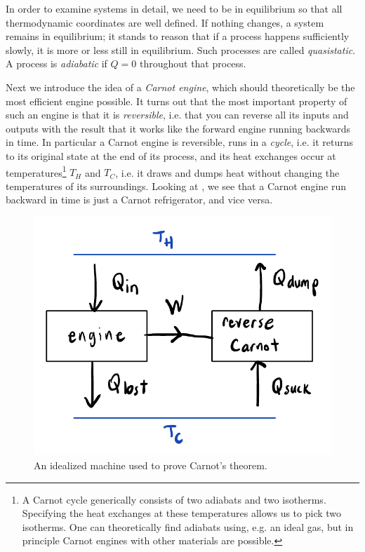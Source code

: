 In order to examine systems in detail, we need to be in equilibrium so that all
thermodynamic coordinates are well defined.
If nothing changes, a system remains in equilibrium; it stands to reason that
if a process happens sufficiently slowly, it is more or less still in
equilibrium. Such processes are called {\it quasistatic}.
A process is {\it adiabatic} if $Q=0$ throughout that process.

Next we introduce the idea of a {\it Carnot engine},
which should theoretically be the most efficient engine possible. 
It turns out that the most important property of such an engine is that it 
is {\it reversible}, i.e. that you can reverse all its inputs
and outputs with the result that it works like the forward engine running
backwards in time. In particular a Carnot engine is reversible,
runs in a {\it cycle}, i.e. it returns to its original state
at the end of its process, and its heat exchanges occur at 
temperatures\footnote{A Carnot cycle generically consists of two adiabats
and two isotherms. Specifying the heat exchanges at these temperatures allows us
to pick two isotherms. One can theoretically find adiabats using, e.g. an ideal
gas, but in principle Carnot engines with other materials are possible.}
$T_H$ and $T_C$, i.e. it draws and dumps heat without changing the
temperatures of its surroundings.
Looking at , we see that a Carnot
engine run backward in time is just a Carnot refrigerator, and vice versa.

\begin{figure}
\centering
\includegraphics[width=0.7\linewidth]{figs/carnotThm.pdf}
\caption{An idealized machine used to prove Carnot's theorem.}
\label{fig:carnot}
\end{figure}

